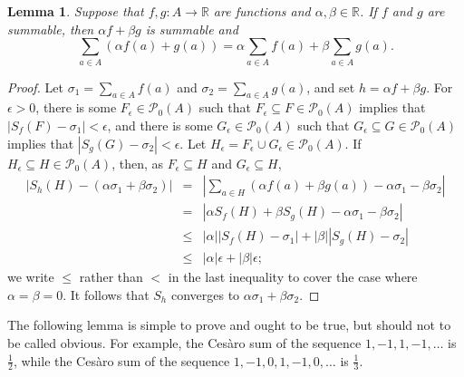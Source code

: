 \documentclass{article}
\newtheorem{lemma}[theorem]{Lemma}
\begin{document}
\begin{lemma}
Suppose that $f,g:A \to \mathbb{R}$ are functions and  $\alpha,\beta \in \mathbb{R}$. If $f$ and $g$ are summable,
then $\alpha f+  \beta g$ is summable and
\[
\sum_{a \in A} (\alpha f(a)+ g(a)) = \alpha \sum_{a \in A} f(a) + \beta  \sum_{a \in A} g(a).
\]
\label{linearity}
\end{lemma}
\begin{proof}
Let $\sigma_1=\sum_{a \in A} f(a)$ and $\sigma_2=\sum_{a \in A} g(a)$, and set $h = \alpha f+ \beta g$.
For $\epsilon>0$, there is some $F_\epsilon \in \mathscr{P}_0(A)$ such that $F_\epsilon \subseteq F \in \mathscr{P}_0(A)$ implies
that $|S_f(F)-\sigma_1|<\epsilon$, and there is some $G_\epsilon \in \mathscr{P}_0(A)$ such that
$G_\epsilon \subseteq G \in \mathscr{P}_0(A)$ implies that $|S_g(G)-\sigma_2|<\epsilon$. Let $H_\epsilon = F_\epsilon \cup G_\epsilon
 \in \mathscr{P}_0(A)$. If $H_\epsilon \subseteq H \in \mathscr{P}_0(A)$, then, as $F_\epsilon \subseteq H$ and $G_\epsilon \subseteq H$,
\begin{eqnarray*}
|S_h(H)- (\alpha \sigma_1 + \beta \sigma_2)|&=&\left|\sum_{a \in H} (\alpha f(a)+\beta g(a)) - \alpha \sigma_1 - \beta \sigma_2 \right|\\
&=&| \alpha S_f(H)+\beta S_g(H) - \alpha \sigma_1 -\beta  \sigma_2|\\
&\leq&|\alpha| |S_f(H) - \sigma_1| +|\beta| |S_g(H)-\sigma_2|\\
&\leq&|\alpha| \epsilon +|\beta| \epsilon;
\end{eqnarray*}
we write $\leq$ rather than $<$ in the last inequality to cover the case where $\alpha=\beta=0$. 
It follows that $S_h$ converges to $\alpha \sigma_1 + \beta \sigma_2$. 
\end{proof}

The following lemma is simple to prove and ought to be true, but should not to be called obvious. 
For example, the Ces\`aro sum of the sequence $1,-1,1,-1,\ldots$ is $\frac{1}{2}$, while the Ces\`aro sum of the sequence
$1,-1,0,1,-1,0,\ldots$ is $\frac{1}{3}$.
\end{document}
